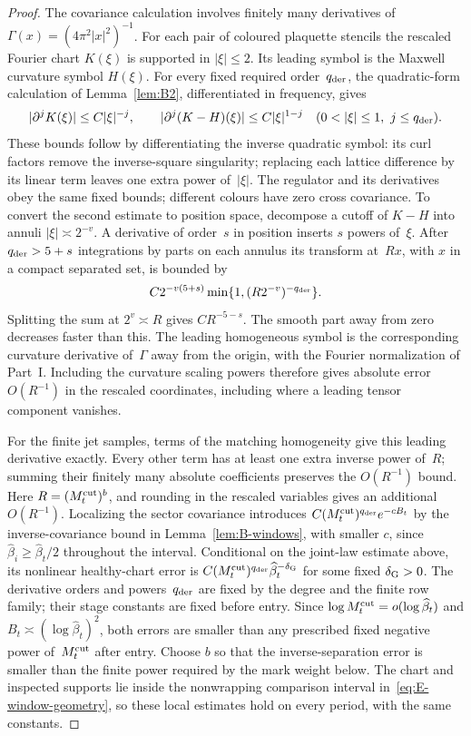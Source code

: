 \begin{proof}
The covariance calculation involves finitely many derivatives of $\Gamma(x)=(4\pi^2|x|^2)^{-1}$. For each pair of coloured plaquette stencils the rescaled Fourier chart $K(\xi)$ is supported in $|\xi|\le2$. Its leading symbol is the Maxwell curvature symbol $H(\xi)$. For every fixed required order~$q_{\rm der}$, the quadratic-form calculation of Lemma~\ref{lem:B2}, differentiated in frequency, gives
\begin{equation*}
 |\partial^jK(\xi)|\le C|\xi|^{-j},\qquad
 |\partial^j(K-H)(\xi)|\le C|\xi|^{1-j}
 \quad(0<|\xi|\le1,\ j\le q_{\rm der}).
\end{equation*}
These bounds follow by differentiating the inverse quadratic symbol: its curl factors remove the inverse-square singularity; replacing each lattice difference by its linear term leaves one extra power of~$|\xi|$. The regulator and its derivatives obey the same fixed bounds; different colours have zero cross covariance. To convert the second estimate to position space, decompose a cutoff of $K-H$ into annuli $|\xi|\asymp2^{-v}$. A derivative of order~$s$ in position inserts $s$ powers of~$\xi$. After $q_{\rm der}>5+s$ integrations by parts on each annulus its transform at~$Rx$, with $x$ in a compact separated set, is bounded by
\begin{equation*}
 C2^{-v(5+s)}\min\{1,(R2^{-v})^{-q_{\rm der}}\}.
\end{equation*}
Splitting the sum at $2^v\asymp R$ gives $CR^{-5-s}$. The smooth part away from zero decreases faster than this. The leading homogeneous symbol is the corresponding curvature derivative of~$\Gamma$ away from the origin, with the Fourier normalization of Part~I. Including the curvature scaling powers therefore gives absolute error $O(R^{-1})$ in the rescaled coordinates, including where a leading tensor component vanishes.

For the finite jet samples, terms of the matching homogeneity give this leading derivative exactly. Every other term has at least one extra inverse power of~$R$; summing their finitely many absolute coefficients preserves the $O(R^{-1})$ bound. Here $R=(M^{\mathrm{cut}}_t)^b$, and rounding in the rescaled variables gives an additional $O(R^{-1})$. Localizing the sector covariance introduces $C(M^{\mathrm{cut}}_t)^{q_{\rm der}} e^{-cB_t}$ by the inverse-covariance bound in Lemma~\ref{lem:B-windows}, with smaller $c$, since $\widehat\beta_i\ge\widehat\beta_t/2$ throughout the interval. Conditional on the joint-law estimate above, its nonlinear healthy-chart error is $C(M^{\mathrm{cut}}_t)^{q_{\rm der}}\widehat\beta_t^{-\delta_{\rm G}}$ for some fixed $\delta_{\rm G}>0$. The derivative orders and powers~$q_{\rm der}$ are fixed by the degree and the finite row family; their stage constants are fixed before entry. Since $\log M^{\mathrm{cut}}_t=o(\log\widehat\beta_t)$ and $B_t\asymp(\log\widehat\beta_t)^2$, both errors are smaller than any prescribed fixed negative power of~$M^{\mathrm{cut}}_t$ after entry. Choose $b$ so that the inverse-separation error is smaller than the finite power required by the mark weight below. The chart and inspected supports lie inside the nonwrapping comparison interval in~\eqref{eq:E-window-geometry}, so these local estimates hold on every period, with the same constants.



\end{proof}
